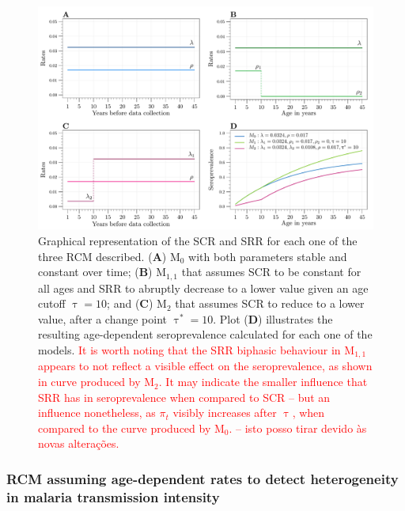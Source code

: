 \begin{figure}[th!]
    \center
    \includegraphics[width=\columnwidth]{images/RCM_structure.pdf}
    \caption[Reverse catalytic models]{Graphical representation of the SCR and SRR for each one of the three RCM described. (\textbf{A}) $\text{M}_0$ with both parameters stable and constant over time; (\textbf{B}) $\text{M}_{1,1}$ that assumes SCR to be constant for all ages and SRR to abruptly decrease to a lower value given an age cutoff $\uptau=10$; and (\textbf{C}) $\text{M}_2$ that assumes SCR to reduce to a lower value, after a change point $\uptau^*=10$. Plot (\textbf{D}) illustrates the resulting age-dependent seroprevalence calculated for each one of the models. \textcolor{red}{It is worth noting that the SRR biphasic behaviour in $\text{M}_{1,1}$ appears to not reflect a visible effect on the seroprevalence, as shown in curve produced by $\text{M}_2$. It may indicate the smaller influence that SRR has in seroprevalence when compared to SCR -- but an influence nonetheless, as $\pi_t$ visibly increases after $\uptau$, when compared to the curve produced by $\text{M}_0$. -- isto posso tirar devido às novas alterações.}}
\label{fig:rcm.models}
\end{figure}


\subsubsection{RCM assuming age-dependent rates to detect heterogeneity in malaria transmission intensity}

